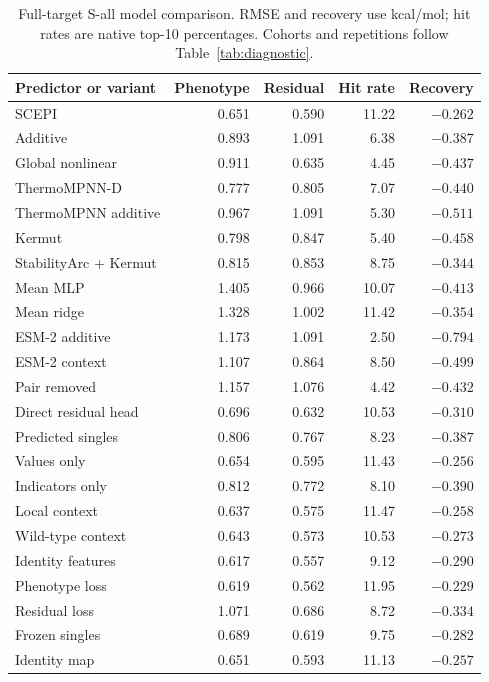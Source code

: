 \documentclass{llncs}
\begin{document}
\begin{table}[!htbp]
\centering
\setlength{\tabcolsep}{5pt}
\caption{Full-target S-all model comparison. RMSE and recovery use kcal/mol; hit rates are native top-10 percentages. Cohorts and repetitions follow Table~\ref{tab:diagnostic}.}
\label{tab:allcomponents}
\begin{tabular}{lrrrr}
\toprule
Predictor or variant & Phenotype & Residual & Hit rate & Recovery \\
\midrule
SCEPI & 0.651 & 0.590 & 11.22 & $-0.262$ \\
Additive & 0.893 & 1.091 & 6.38 & $-0.387$ \\
Global nonlinear & 0.911 & 0.635 & 4.45 & $-0.437$ \\
ThermoMPNN-D & 0.777 & 0.805 & 7.07 & $-0.440$ \\
ThermoMPNN additive & 0.967 & 1.091 & 5.30 & $-0.511$ \\
Kermut & 0.798 & 0.847 & 5.40 & $-0.458$ \\
StabilityArc + Kermut & 0.815 & 0.853 & 8.75 & $-0.344$ \\
Mean MLP & 1.405 & 0.966 & 10.07 & $-0.413$ \\
Mean ridge & 1.328 & 1.002 & 11.42 & $-0.354$ \\
ESM-2 additive & 1.173 & 1.091 & 2.50 & $-0.794$ \\
ESM-2 context & 1.107 & 0.864 & 8.50 & $-0.499$ \\
Pair removed & 1.157 & 1.076 & 4.42 & $-0.432$ \\
Direct residual head & 0.696 & 0.632 & 10.53 & $-0.310$ \\
Predicted singles & 0.806 & 0.767 & 8.23 & $-0.387$ \\
Values only & 0.654 & 0.595 & 11.43 & $-0.256$ \\
Indicators only & 0.812 & 0.772 & 8.10 & $-0.390$ \\
Local context & 0.637 & 0.575 & 11.47 & $-0.258$ \\
Wild-type context & 0.643 & 0.573 & 10.53 & $-0.273$ \\
Identity features & 0.617 & 0.557 & 9.12 & $-0.290$ \\
Phenotype loss & 0.619 & 0.562 & 11.95 & $-0.229$ \\
Residual loss & 1.071 & 0.686 & 8.72 & $-0.334$ \\
Frozen singles & 0.689 & 0.619 & 9.75 & $-0.282$ \\
Identity map & 0.651 & 0.593 & 11.13 & $-0.257$ \\

\end{tabular}
\end{table}
\end{document}
